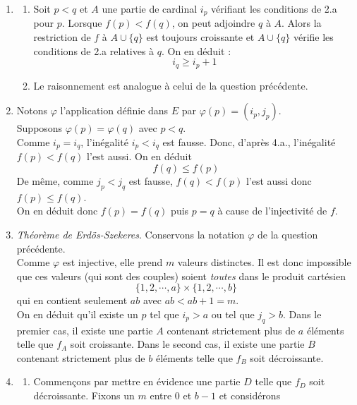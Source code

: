 \begin{enumerate}
\item \begin{enumerate}
 \item Soit $p<q$ et $A$ une partie de cardinal $i_p$ vérifiant les conditions de 2.a pour $p$. Lorsque $f(p)<f(q)$, on peut adjoindre $q$ à $A$. Alors la restriction de $f$ à $A\cup \{q\}$ est toujours croissante et $A\cup \{q\}$ vérifie les conditions de 2.a relatives à $q$. On en déduit :
\begin{displaymath}
 i_q \geq i_p + 1
\end{displaymath}
\item Le raisonnement est analogue à celui de la question précédente.
\end{enumerate}

\item Notons $\varphi$ l'application définie dans $E$ par $\varphi(p)=(i_p,j_p)$.\\
Supposons $\varphi(p)=\varphi(q)$ avec $p<q$.\\
Comme $i_p=i_q$, l'inégalité $i_p < i_q$ est fausse. Donc, d'après 4.a., l'inégalité $f(p)<f(q)$ l'est aussi. On en déduit
\begin{displaymath}
 f(q) \leq f(p)
\end{displaymath}
De même, comme $j_p<j_q$ est fausse, $f(q)<f(p)$ l'est aussi donc $f(p)\leq f(q)$.\\
On en déduit donc $f(p)=f(q)$ puis $p=q$ à cause de l'injectivité de $f$.
\item \emph{Théorème de Erdös-Szekeres}. Conservons la notation $\varphi$ de la question précédente.\\
Comme $\varphi$ est injective, elle prend $m$ valeurs distinctes. Il est donc impossible que ces valeurs (qui sont des couples) soient \emph{toutes} dans le produit cartésien
\begin{displaymath}
 \{1,2,\cdots,a\}\times\{1,2,\cdots,b\}
\end{displaymath}
qui en contient seulement $ab$ avec $ab<ab+1=m$.\\
On en déduit qu'il existe un $p$ tel que $i_p>a$ ou tel que $j_q>b$. Dans le premier cas, il existe une partie $A$ contenant strictement plus de $a$ éléments telle que $f_A$ soit croissante. Dans le second cas, il existe une partie $B$ contenant strictement plus de $b$ éléments telle que $f_B$ soit décroissante.
\item \begin{enumerate}
 \item Commençons par mettre en évidence une partie $D$ telle que $f_D$ soit décroissante. Fixons un $m$ entre $0$ et $b-1$ et considérons

\end{enumerate}
\end{enumerate}
